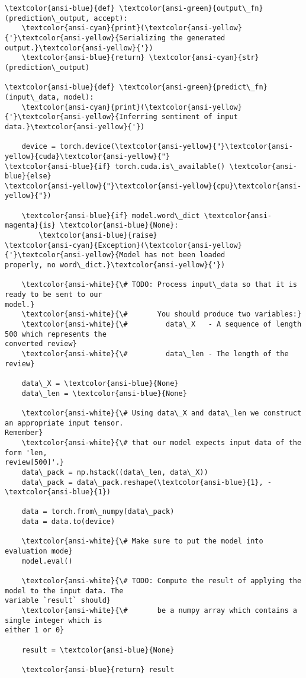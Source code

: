 \documentclass[11pt]{article}
\begin{document}
\begin{Verbatim}[commandchars=\\\{\}]
\textcolor{ansi-blue}{def} \textcolor{ansi-green}{output\_fn}(prediction\_output, accept):
    \textcolor{ansi-cyan}{print}(\textcolor{ansi-yellow}{'}\textcolor{ansi-yellow}{Serializing the generated
output.}\textcolor{ansi-yellow}{'})
    \textcolor{ansi-blue}{return} \textcolor{ansi-cyan}{str}(prediction\_output)

\textcolor{ansi-blue}{def} \textcolor{ansi-green}{predict\_fn}(input\_data, model):
    \textcolor{ansi-cyan}{print}(\textcolor{ansi-yellow}{'}\textcolor{ansi-yellow}{Inferring sentiment of input
data.}\textcolor{ansi-yellow}{'})

    device = torch.device(\textcolor{ansi-yellow}{"}\textcolor{ansi-yellow}{cuda}\textcolor{ansi-yellow}{"}
\textcolor{ansi-blue}{if} torch.cuda.is\_available() \textcolor{ansi-blue}{else}
\textcolor{ansi-yellow}{"}\textcolor{ansi-yellow}{cpu}\textcolor{ansi-yellow}{"})

    \textcolor{ansi-blue}{if} model.word\_dict \textcolor{ansi-magenta}{is} \textcolor{ansi-blue}{None}:
        \textcolor{ansi-blue}{raise}
\textcolor{ansi-cyan}{Exception}(\textcolor{ansi-yellow}{'}\textcolor{ansi-yellow}{Model has not been loaded
properly, no word\_dict.}\textcolor{ansi-yellow}{'})

    \textcolor{ansi-white}{\# TODO: Process input\_data so that it is ready to be sent to our
model.}
    \textcolor{ansi-white}{\#       You should produce two variables:}
    \textcolor{ansi-white}{\#         data\_X   - A sequence of length 500 which represents the
converted review}
    \textcolor{ansi-white}{\#         data\_len - The length of the review}

    data\_X = \textcolor{ansi-blue}{None}
    data\_len = \textcolor{ansi-blue}{None}

    \textcolor{ansi-white}{\# Using data\_X and data\_len we construct an appropriate input tensor.
Remember}
    \textcolor{ansi-white}{\# that our model expects input data of the form 'len,
review[500]'.}
    data\_pack = np.hstack((data\_len, data\_X))
    data\_pack = data\_pack.reshape(\textcolor{ansi-blue}{1}, -\textcolor{ansi-blue}{1})

    data = torch.from\_numpy(data\_pack)
    data = data.to(device)

    \textcolor{ansi-white}{\# Make sure to put the model into evaluation mode}
    model.eval()

    \textcolor{ansi-white}{\# TODO: Compute the result of applying the model to the input data. The
variable `result` should}
    \textcolor{ansi-white}{\#       be a numpy array which contains a single integer which is
either 1 or 0}

    result = \textcolor{ansi-blue}{None}

    \textcolor{ansi-blue}{return} result
    \end{Verbatim}
\end{document}
